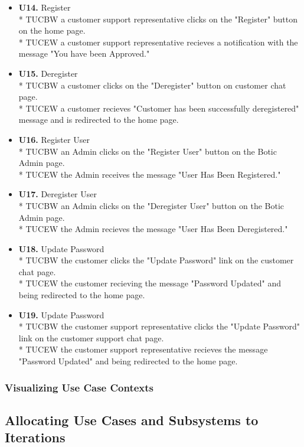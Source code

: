 \documentclass[11pt]{article}
\begin{document}
\begin{itemize}
	\item[] \textbf{U14.} Register\\*
	TUCBW a customer support representative clicks on the "Register" button on the home page. \\*
	TUCEW a customer support representative recieves a notification with the message "You have been Approved."
	\item[] \textbf{U15.} Deregister\\*
	TUCBW a customer clicks on the "Deregister" button on customer chat page.\\*
	TUCEW a customer recieves "Customer has been successfully deregistered" message and is redirected to the home page.
	\item[] \textbf{U16.} Register User\\*
	TUCBW an Admin clicks on the "Register User" button on the Botic Admin page.\\*
	TUCEW the Admin receives the message "User Has Been Registered."
	\item[] \textbf{U17.} Deregister User\\*
	TUCBW an Admin clicks on the "Deregister User" button on the Botic Admin page.\\*
	TUCEW the Admin recieves the message "User Has Been Deregistered."
	\item[] \textbf{U18.} Update Password\\*
	TUCBW the customer clicks the "Update Password" link on the customer chat page.\\*
	TUCEW the customer recieving the message "Password Updated" and being redirected to the home page.
	\item[] \textbf{U19.} Update Password\\*
	TUCBW the customer support representative clicks the "Update Password" link on the customer support chat page.\\*
	TUCEW the customer support representative recieves the message "Password Updated" and being redirected to the home page. 
\end{itemize}

\subsubsection{Visualizing Use Case Contexts}


\subsection{Allocating Use Cases and Subsystems to Iterations}
\end{document}
